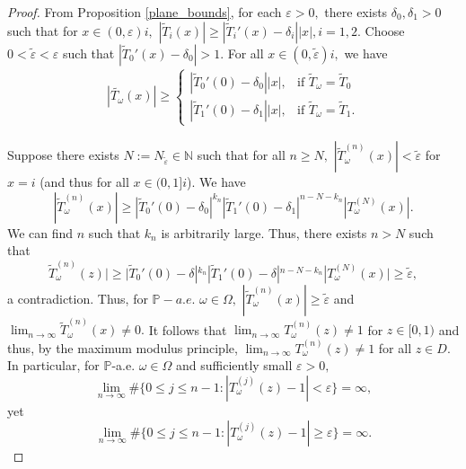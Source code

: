 \documentclass[12pt,reqno]{amsart}
\numberwithin{theorem}{section}
\begin{document}
\begin{proof}
     From Proposition \ref{plane_bounds}, for each $\varepsilon>0,$ there exists $\delta_0, \delta_1>0$ such that for $x\in(0,\varepsilon)i,$ $|\tilde{T}_i(x)|\ge|\tilde{T}_{i}'(x)-\delta_i||x|, i=1,2.$ Choose $0<\tilde{\varepsilon}<\varepsilon$ such that $|\tilde{T}_{0}'(x)-\delta_0|>1.$  For all $x\in(0,\tilde{\varepsilon})i,$ we have \begin{align*}
        |\tilde{T_{\omega}}(x)|\ge\begin{cases}
            |\tilde{T}_{0}'(0)-\delta_0||x|,&\text{if }\tilde{T}_{\omega}=\tilde{T}_0\\|\tilde{T}_{1}'(0)-\delta_1||x|,&\text{if }\tilde{T}_{\omega}=\tilde{T}_{1}.
        \end{cases}
    \end{align*}  

    
    Suppose there exists $N:=N_{\tilde{\varepsilon}}\in\mathbb{N}$ such that for all $n\ge N,$  $|\tilde{T}_{\omega}^{(n)}(x)|<\tilde{\varepsilon}$ for $x=i$ (and thus for all $x\in(0,1]i$). We have $$|\tilde{T}_{\omega}^{(n)}(x)|\ge|\tilde{T}_{0}'(0)-\delta_0|^{k_n}|\tilde{T}_{1}'(0)-\delta_1|^{n-N-k_n}|T_{\omega}^{(N)}(x)|.$$ We can find $n$ such that $k_n$ is arbitrarily large. Thus, there exists $n>N$ such that $$\tilde{T}_{\omega}^{(n)}(z)|\ge|\tilde{T}_{0}'(0)-\delta|^{k_n}|\tilde{T}_{1}'(0)-\delta|^{n-N-k_n}|T_{\omega}^{(N)}(x)|\ge\tilde{\varepsilon},$$ a contradiction. Thus, for $\mathbb{P}-a.e.$ $\omega\in\Omega,$ $|\tilde{T}_{\omega}^{(n)}(x)|\ge\tilde{\varepsilon}$ and  $\lim_{n\to\infty}\tilde{T}_{\omega}^{(n)}(x)\neq0.$ It follows that $\lim_{n\to\infty}T_{\omega}^{(n)}(z)\neq1$ for $z\in[0,1)$ and thus, by the maximum modulus principle, $\lim_{n\to\infty}T_{\omega}^{(n)}(z)\neq1$ for all $z\in D.$ In particular, for $\mathbb{P}$-a.e. $\omega\in\Omega$ and sufficiently small $\varepsilon>0,$ $$\lim_{n\to\infty}\#\{0\le j\le n-1:|T_{\omega}^{(j)}(z)-1|<\varepsilon\}=\infty,$$ yet   $$\lim_{n\to\infty}\#\{0\le j\le n-1:|T_{\omega}^{(j)}(z)-1|\ge\varepsilon\}=\infty.$$ 
\end{proof}
\end{document}
